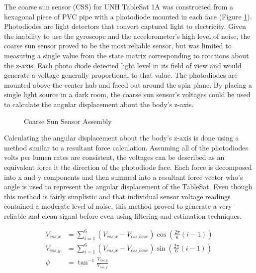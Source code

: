 The coarse sun sensor (CSS) for UNH TableSat 1A was constructed from a hexagonal piece of PVC pipe with a photodiode mounted in each face (Figure \ref{fig:CoarseSunSensorAssembly}).  Photodiodes are light detectors that convert captured light to electricity.  Given the inability to use the gyroscope and the accelerometer's high level of noise, the coarse sun sensor proved to be the most reliable sensor, but was limited to measuring a single value from the state matrix corresponding to rotations about the z-axis.  Each photo diode detected light level in its field of view and would generate a voltage generally proportional to that value.  The photodiodes are mounted above the center hub and faced out around the spin plane.  By placing a single light source in a dark room, the coarse sun sensor's voltages could be used to calculate the angular displacement about the body's z-axis.

\begin{figure}[ht]
  \centerline{}
  \caption{Coarse Sun Sensor Assembly}
  \label{fig:CoarseSunSensorAssembly}
\end{figure}

Calculating the angular displacement about the body's z-axis is done using a method similar to a resultant force calculation.  Assuming all of the photodiodes volts per lumen rates are consistent, the voltages can be described as an equivalent force it the direction of the photodiode face.  Each force is decomposed into x and y components and then summed into a resultant force vector who's angle is used to represent the angular displacement of the TableSat.  Even though this method is fairly simplistic and that individual sensor voltage readings contained a moderate level of noise, this method proved to generate a very reliable and clean signal before even using filtering and estimation techniques.

\begin{subequations}
  \begin{align}
    V_{css\_x} & = \sum\limits_{i=1}^6 (V_{css\_x} - V_{css\_base}) \cos \left( \frac{2\pi}{6} (i-1)\right) \\
    V_{css\_y} & = \sum\limits_{i=1}^6 (V_{css\_x} - V_{css\_base}) \sin \left( \frac{2\pi}{6} (i-1)\right) \\
    \psi & = \tan^{-1} \frac{V_{css\_y}}{V_{css\_x}}
  \end{align}
  \label{eqn:CSSResultantForce}
\end{subequations}

